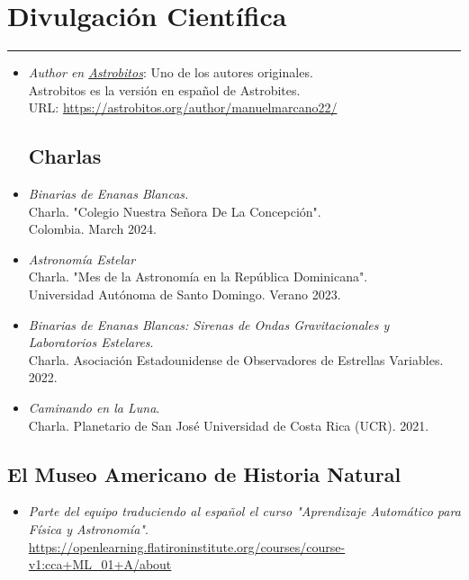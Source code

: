 \documentclass[letterpaper,10pt]{article}
\begin{document}
\section*{Divulgaci\'on Cient\'ifica}
\hrule
\vspace{.3 cm}
\begin{itemize}[label=$\blacktriangleright$]

\item \emph{Author en \href{https://astrobitos.org/}{Astrobitos}}: Uno de los autores originales. \\ Astrobitos es la versi\'on en espa\~{n}ol de Astrobites.\\ URL: \url{https://astrobitos.org/author/manuelmarcano22/}


\subsection*{Charlas}


\item \textit{Binarias de Enanas Blancas.} \\
Charla. "Colegio Nuestra Se\~{n}ora De La Concepci\'on". \\
Colombia. March 2024.


\item \textit{Astronom\'ia Estelar} \\
Charla. "Mes de la Astronom\'ia en la Rep\'ublica Dominicana". \\Universidad Aut\'onoma de Santo Domingo. Verano 2023.


\item \textit{Binarias de Enanas Blancas: Sirenas de Ondas Gravitacionales y Laboratorios Estelares}. \\
Charla. Asociaci\'on Estadounidense de Observadores de Estrellas Variables. 2022.




\item \textit{Caminando en la Luna}. \\
Charla. Planetario de San Jos\'e Universidad de Costa Rica (UCR). 2021.


\end{itemize}



\subsection*{El Museo Americano de Historia Natural}

\begin{itemize}[label=$\blacktriangleright$]

	\item \textit{Parte del equipo traduciendo al espa\~{n}ol el curso "Aprendizaje Autom\'atico para F\'isica y Astronom\'ia"}. \\
\url{https://openlearning.flatironinstitute.org/courses/course-v1:cca+ML_01+A/about}

\end{itemize}
\end{document}
